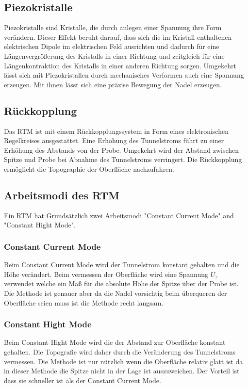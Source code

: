 \subsection{Piezokristalle}
Piezokristalle sind Kristalle, die durch anlegen einer Spannung ihre Form verändern. Dieser Effekt beruht darauf, dass sich die im Kristall enthaltenen elektrischen Dipole im elektrischen Feld ausrichten und dadurch für eine Längenvergrößerung des Kristalls in einer Richtung und zeitgleich für eine Längenkontraktion des Kristalls in einer anderen Richtung sorgen. Umgekehrt lässt sich mit
Piezokristallen durch mechanisches Verformen auch eine Spannung erzeugen.
Mit ihnen lässt sich eine präzise Bewegung der Nadel erzeugen. 
\subsection{Rückkopplung}
Das RTM ist mit einem Rückkopplungssystem in Form eines elektronischen Regelkreises
ausgestattet. Eine Erhöhung des Tunnelstroms führt zu einer Erhöhung des Abstands von der Probe. Umgekehrt wird der Abstand zwischen Spitze und Probe bei Abnahme des Tunnelstroms verringert. Die Rückkopplung ermöglicht die Topographie der Oberfläche nachzufahren.
\subsection{Arbeitsmodi des RTM}
Ein RTM hat Grundsätzlich zwei Arbeitsmodi "Constant Current Mode" and "Constant Hight Mode".
\subsubsection{Constant Current Mode}
Beim Constant Current Mode wird der Tunnelstrom konstant gehalten und die Höhe verändert. Beim vermessen der Oberfläche wird eine Spannung $U_z$ verwendet welche ein Maß für die absolute Höhe der Spitze über der Probe ist. Die Methode ist genauer aber da die Nadel vorsichtig beim überqueren der Oberfläche seien muss ist die Methode recht langsam. 
\subsubsection{Constant Hight Mode}
Beim Constant Hight Mode wird die der Abstand zur Oberfläche konstant gehalten. Die Topografie wird daher durch die Veränderung des Tunnelstroms vermessen. Die Methode ist nur nützlich wenn die Oberfläche relativ glatt ist da in dieser Methode die Spitze nicht in der Lage ist auszuweichen. Der Vorteil ist dass sie schneller ist als der Constant Current Mode.
